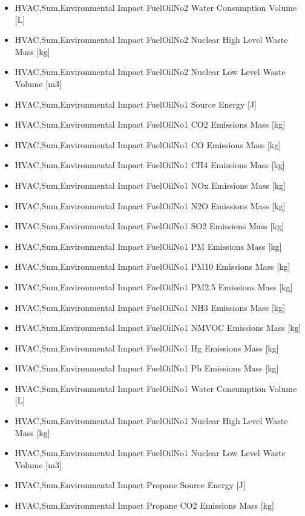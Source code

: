 \begin{itemize}
\item
  HVAC,Sum,Environmental Impact FuelOilNo2 Water Consumption Volume {[}L{]}
\item
  HVAC,Sum,Environmental Impact FuelOilNo2 Nuclear High Level Waste Mass {[}kg{]}
\item
  HVAC,Sum,Environmental Impact FuelOilNo2 Nuclear Low Level Waste Volume {[}m3{]}
\item
  HVAC,Sum,Environmental Impact FuelOilNo1 Source Energy {[}J{]}
\item
  HVAC,Sum,Environmental Impact FuelOilNo1 CO2 Emissions Mass {[}kg{]}
\item
  HVAC,Sum,Environmental Impact FuelOilNo1 CO Emissions Mass {[}kg{]}
\item
  HVAC,Sum,Environmental Impact FuelOilNo1 CH4 Emissions Mass {[}kg{]}
\item
  HVAC,Sum,Environmental Impact FuelOilNo1 NOx Emissions Mass {[}kg{]}
\item
  HVAC,Sum,Environmental Impact FuelOilNo1 N2O Emissions Mass {[}kg{]}
\item
  HVAC,Sum,Environmental Impact FuelOilNo1 SO2 Emissions Mass {[}kg{]}
\item
  HVAC,Sum,Environmental Impact FuelOilNo1 PM Emissions Mass {[}kg{]}
\item
  HVAC,Sum,Environmental Impact FuelOilNo1 PM10 Emissions Mass {[}kg{]}
\item
  HVAC,Sum,Environmental Impact FuelOilNo1 PM2.5 Emissions Mass {[}kg{]}
\item
  HVAC,Sum,Environmental Impact FuelOilNo1 NH3 Emissions Mass {[}kg{]}
\item
  HVAC,Sum,Environmental Impact FuelOilNo1 NMVOC Emissions Mass {[}kg{]}
\item
  HVAC,Sum,Environmental Impact FuelOilNo1 Hg Emissions Mass {[}kg{]}
\item
  HVAC,Sum,Environmental Impact FuelOilNo1 Pb Emissions Mass {[}kg{]}
\item
  HVAC,Sum,Environmental Impact FuelOilNo1 Water Consumption Volume {[}L{]}
\item
  HVAC,Sum,Environmental Impact FuelOilNo1 Nuclear High Level Waste Mass {[}kg{]}
\item
  HVAC,Sum,Environmental Impact FuelOilNo1 Nuclear Low Level Waste Volume {[}m3{]}
\item
  HVAC,Sum,Environmental Impact Propane Source Energy {[}J{]}
\item
  HVAC,Sum,Environmental Impact Propane CO2 Emissions Mass {[}kg{]}

\end{itemize}
